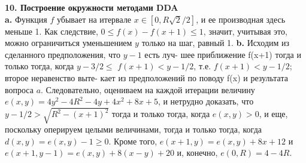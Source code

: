 \noindent\textbf{10. Построение окружности методами DDA}\\

\hspace*{15pt}\textbf{a.} Функция $f$ убывает на итервале $x\in[0,R\sqrt{2}/2]$, и ее производная\linebreak
здесь меньше 1. Как следствие, $0\leqslant f(x)-f(x+1)\leqslant1$, значит, учитывая\linebreak
это, можно ограничиться уменьшением $y$ только на шаг, равный 1.\newline
\hspace*{15pt}\textbf{b.} Исходим из сделанного предположения, что $y-1$ есть луч-\linebreak
шее приближение f(x+1) тогда и только тогда, когда $y-3/2\leqslant$\linebreak
$f(x+1)<y-1/2$, т.е. $f(x+1)<y-1/2$; второе неравенство выте-\linebreak
кает из предположений по поводу f(x) и результата вопроса $a$.\newline
\hspace*{15pt}Следовательно, оцениваем на каждой итерации величину\linebreak
$e(x,y)=4y^2-4R^2-4y+4x^2+8x+5$, и нетрудно доказать, что\linebreak
$y-1/2>\sqrt{R^2-(x+1)^2}$ тогда и только тогда, когда $e(x,y)>0$, и\linebreak
еще, поскольку оперируем целыми величинами, тогда и только тогда,\linebreak
когда $d(x,y)=e(x,y)-1\geqslant 0$. Кроме того, $e(x+1,y)=e(x,y)+8x+12$\linebreak
и $e(x+1,y-1)=e(x,y)+8(x-y)+20$ и, конечно, $e(0,R)=4-4R$.\newpage



